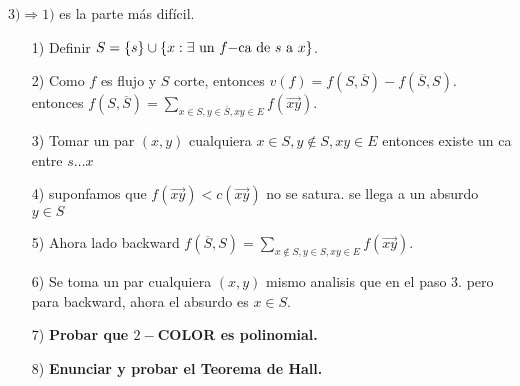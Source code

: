 \documentclass[12pt,a4paper]{article}
\begin{document}
$3) \Rightarrow 1)$ es la parte más difícil. 
\begin{itemize}
    \item [1)] Definir $S = \left\lbrace s \right\rbrace \cup \left\lbrace x: \exists\,\, \text{un $f-$ca de $s$ a $x$} \right\rbrace$.
    \item [2)] Como $f$ es flujo y $S$ corte, entonces $v(f) = f(S,\overline{S}) - f(\overline{S},S)$. 
        entonces $f(S,\overline{S}) = \sum_{x\in S, y\in \overline{S}, xy\in E} f(\overrightarrow{xy})$.
    \item [3)] Tomar un par $(x,y)$ cualquiera $x\in S, y\notin S, xy\in E$ entonces 
        existe un ca entre $s\ldots x$
    \item [4)] suponfamos que $f(\overrightarrow{xy}) < c(\overrightarrow{xy})$ 
        no se satura. se llega a un absurdo $y \in S$
    \item [5)] Ahora lado backward $f(\overline{S},S) = \sum_{x\notin S, y\in S, xy\in E} f(\overrightarrow{xy})$.
    \item [6)] Se toma un par cualquiera $(x,y)$ mismo analisis que en el paso 3.
        pero para backward, ahora el absurdo es $x\in S$. 
\end{itemize}

\begin{itemize}
    \item [7)] \textbf{Probar que $2-$COLOR es polinomial.}
    \label{dem:2color}
\end{itemize}

\begin{itemize}
    \item [8)] \textbf{Enunciar y probar el Teorema de Hall.}
    \label{dem:hall}
\end{itemize}
\end{document}
